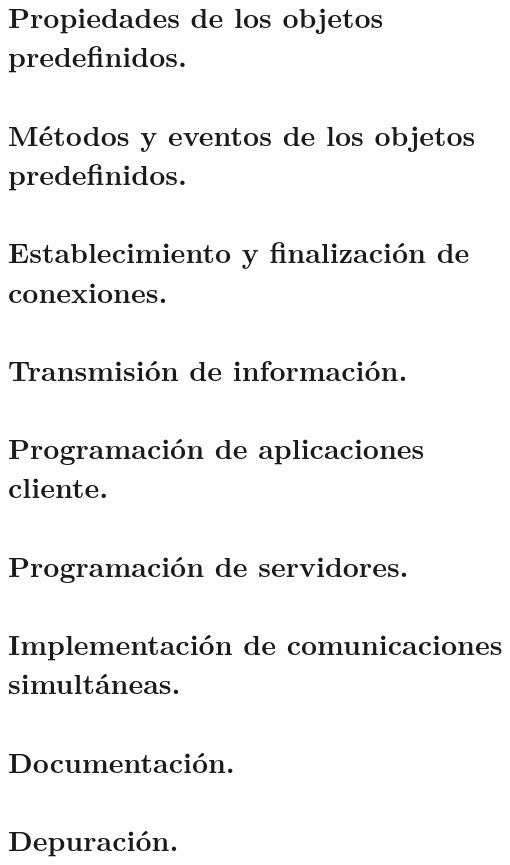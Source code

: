 \documentclass[a4paper,12pt,spanish]{sphinxmanual}
\begin{document}
\section{Propiedades de los objetos predefinidos.}
\label{textos/tema4:propiedades-de-los-objetos-predefinidos}

\section{Métodos y eventos de los objetos predefinidos.}
\label{textos/tema4:metodos-y-eventos-de-los-objetos-predefinidos}

\section{Establecimiento y finalización de conexiones.}
\label{textos/tema4:establecimiento-y-finalizacion-de-conexiones}

\section{Transmisión de información.}
\label{textos/tema4:transmision-de-informacion}

\section{Programación de aplicaciones cliente.}
\label{textos/tema4:programacion-de-aplicaciones-cliente}

\section{Programación de servidores.}
\label{textos/tema4:programacion-de-servidores}

\section{Implementación de comunicaciones simultáneas.}
\label{textos/tema4:implementacion-de-comunicaciones-simultaneas}

\section{Documentación.}
\label{textos/tema4:documentacion}

\section{Depuración.}
\label{textos/tema4:depuracion}
\end{document}
